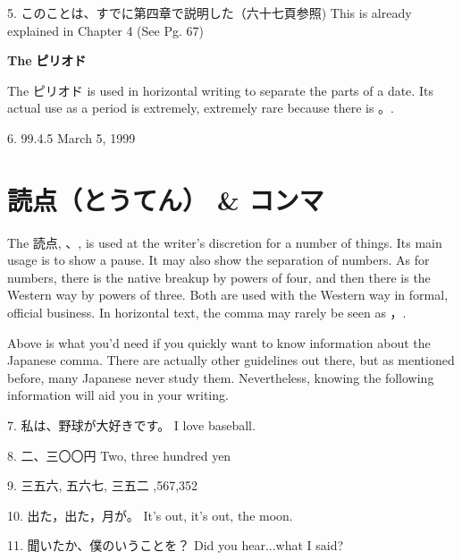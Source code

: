 \par{5. このことは、すでに第四章で説明した（六十七頁参照) \hfill\break
This is already explained in Chapter 4 (See Pg. 67) }

\begin{center}
 \textbf{The }\textbf{ピリオド }
\end{center}
 
\par{The ピリオド is used in horizontal writing to separate the parts of a date. Its actual use as a period is extremely, extremely rare because there is 。. }
 
\par{6. 99.4.5 \hfill\break
March 5, 1999 }
      
\section{読点（とうてん） \& コンマ}
 
\par{ The 読点, 、, is used at the writer's discretion for a number of things. Its main usage is to show a pause. It may also show the separation of numbers. As for numbers, there is the native breakup by powers of four, and then there is the Western way by powers of three. Both are used with the Western way in formal, official business. In horizontal text, the comma may rarely be seen as ，. }

\par{ Above is what you'd need if you quickly want to know information about the Japanese comma. There are actually other guidelines out there, but as mentioned before, many Japanese never study them. Nevertheless, knowing the following information will aid you in your writing. }

\par{7. 私は、野球が大好きです。 \hfill\break
I love baseball. }

\par{8. 二、三〇〇円 \hfill\break
Two, three hundred yen }

\par{9. 三五六, 五六七, 三五二 \hfill{},567,352 }

\par{10. 出た，出た，月が。 \hfill\break
It's out, it's out, the moon. }

\par{11. 聞いたか、僕のいうことを？ \hfill\break
Did you hear\dothyp{}\dothyp{}\dothyp{}what I said? }

